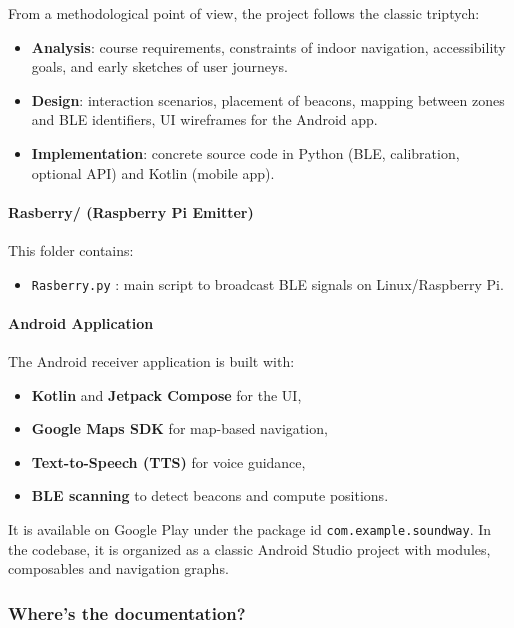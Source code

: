 \documentclass[12pt,a4paper]{article}
\begin{document}
From a methodological point of view, the project follows the classic triptych:

\begin{itemize}
    \item \textbf{Analysis}: course requirements, constraints of indoor navigation, accessibility goals, and early sketches of user journeys.
    \item \textbf{Design}: interaction scenarios, placement of beacons, mapping between zones and BLE identifiers, UI wireframes for the Android app.
    \item \textbf{Implementation}: concrete source code in Python (BLE, calibration, optional API) and Kotlin (mobile app).
\end{itemize}

\paragraph{Rasberry/ (Raspberry Pi Emitter)}

This folder contains:

\begin{itemize}
    \item \texttt{Rasberry.py} : main script to broadcast BLE signals on Linux/Raspberry Pi.
\end{itemize}

\paragraph{Android Application}

The Android receiver application is built with:

\begin{itemize}
    \item \textbf{Kotlin} and \textbf{Jetpack Compose} for the UI,
    \item \textbf{Google Maps SDK} for map-based navigation,
    \item \textbf{Text-to-Speech (TTS)} for voice guidance,
    \item \textbf{BLE scanning} to detect beacons and compute positions.
\end{itemize}

It is available on Google Play under the package id \texttt{com.example.soundway}.  
In the codebase, it is organized as a classic Android Studio project with modules, composables and navigation graphs.

\newpage
\subsubsection{Where's the documentation?}
\end{document}

